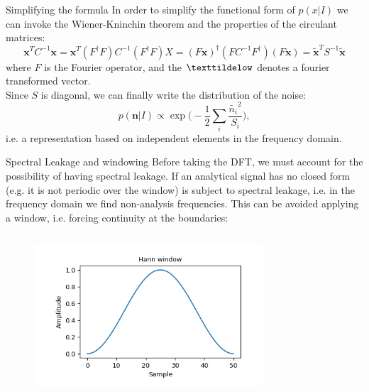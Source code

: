 \documentclass[
10pt,
aspectratio=169,
]{beamer}
\begin{document}
\begin{frame}{Simplifying the formula}
In order to simplify the functional form of $p(x|I)$ we can invoke the Wiener-Kninchin theorem and the properties of the circulant matrices:
\[
\boldsymbol{x}^TC^{-1}\boldsymbol{x} = \boldsymbol{x}^T(F^\dag F)C^{-1}(F^\dag F)X = (F\boldsymbol{x})^\dag(FC^{-1}F^\dag)(F\boldsymbol{x}) = \boldsymbol{\tilde{x}}^T S^{-1}\boldsymbol{\tilde{x}}
\]
where $F$ is the Fourier operator, and the $\texttildelow$ denotes a fourier transformed vector.\\
Since $S$ is diagonal, we can finally write the distribution of the noise:
\[
p(\boldsymbol{n}|I) \propto \exp\biggl(-\frac{1}{2}\sum_i \frac{\tilde{n_i}^2}{S_i}\biggr),
\]
i.e. a representation based on independent elements in the frequency domain.
\end{frame}
\begin{frame}{Spectral Leakage and windowing}
    Before taking the DFT, we must account for the possibility of having spectral leakage.
\vfill
    If an analytical signal has no closed form (e.g. it is not periodic over the window) is subject to spectral leakage, i.e. in the frequency domain we find non-analysis frequencies.
    \vfill 
    This can be avoided applying a window, i.e. forcing continuity at the boundaries:
    \begin{columns}
        \begin{figure}
            \centering
            \includegraphics[width=\columnwidth]{hann.png}
        \end{figure}
        \begin{figure}
            \centering

\end{figure}
\end{columns}
\end{frame}
\end{document}
